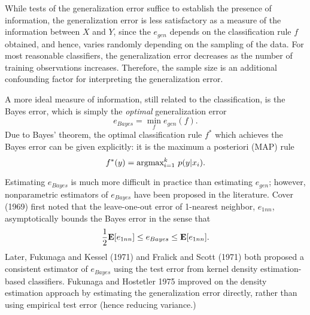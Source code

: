 \documentclass[12pt]{article}
\begin{document}
While tests of the generalization error suffice to establish the presence of information,
the generalization error is less satisfactory as a measure of the information between $X$ and $Y$,
since the $e_{gen}$ depends on the classification rule $f$ obtained, and hence, varies randomly depending on the sampling of the data.
For most reasonable classifiers, the generalization error decreases as the number of training observations increases.
Therefore, the sample size is an additional confounding factor for interpreting the generalization error.

A more ideal measure of information, still related to the classification, is the Bayes error, which is simply the \emph{optimal} generalization error
\[
e_{Bayes} = \min_f e_{gen}(f).
\]
Due to Bayes' theorem, the optimal classification rule $f^*$ which achieves the Bayes error can be given explicitly:
it is the maximum a posteriori (MAP) rule
\[
f^*(y) = \text{argmax}_{i=1}^k\ p(y|x_i).
\]

Estimating $e_{Bayes}$ is much more difficult in practice than estimating $e_{gen}$;
however, nonparametric estimators of $e_{Bayes}$ have been proposed in the literature.
Cover (1969) first noted that the leave-one-out error of 1-nearest neighbor, $e_{1nn}$,
asymptotically bounds the Bayes error in the sense that
\[
\frac{1}{2}\textbf{E}[e_{1nn}] \leq e_{Bayes} \leq \textbf{E}[e_{1nn}].
\]
Later, Fukunaga and Kessel (1971) and Fralick and Scott (1971) both proposed a consistent estimator of $e_{Bayes}$
using the test error from kernel density estimation-based classifiers.
Fukunaga and Hostetler 1975 improved on the density estimation approach by estimating the generalization error directly,
rather than using empirical test error (hence reducing variance.)
\end{document}

